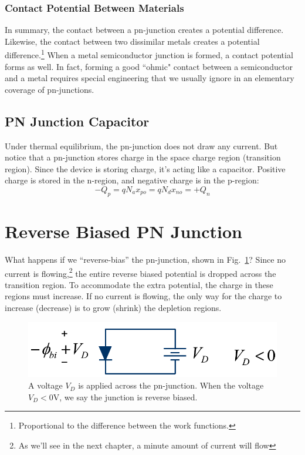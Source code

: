  
\subsubsection{Contact Potential Between Materials}

In summary, the contact between a pn-junction creates a potential difference.    Likewise, the contact between two dissimilar metals creates a potential difference.\footnote{Proportional to the difference between the work functions.}   When a metal semiconductor junction is formed, a contact potential forms as well.  In fact, forming a good ``ohmic" contact between a semiconductor and a metal requires special engineering that we usually ignore in an elementary coverage of pn-junctions.   



\subsection{PN Junction Capacitor}

Under thermal equilibrium, the pn-junction does not draw any current.   But notice that a pn-junction stores charge in the space charge region (transition region).   Since the device is storing charge, it's acting like a capacitor.    Positive charge is stored in the n-region, and negative charge is in the p-region:
\begin{equation} 
	-Q_p = q{N_a}{x_{po}} = q{N_d}{x_{no}} = +Q_n
\end{equation}

\section{Reverse Biased PN Junction}

What happens if we “reverse-bias” the pn-junction, shown in Fig.~\ref{fig:slide28}?  Since no current is flowing,\footnote{As we'll see in the next chapter, a minute amount of current will flow} the entire reverse biased potential is dropped across the transition region.   To accommodate the extra potential, the charge in these regions must increase.   If no current is flowing, the only way for the charge to increase (decrease) is to grow (shrink) the depletion regions.



\begin{figure}[tb]
\begin{center}
\includegraphics[width=.5\columnwidth]{slide28}
\end{center}
\caption{A voltage $V_D$ is applied across the pn-junction.  When the voltage $V_D < 0$V, we say the junction is reverse biased.  } \label{fig:slide28}
\end{figure}

